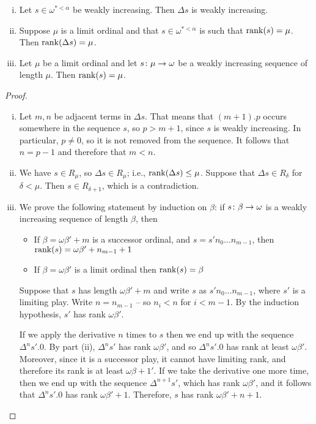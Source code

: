 \documentclass[11pt]{article} %
\begin{document}
\begin{lemma}
  \label{WeaklyIncreasingLemma}
  \begin{enumerate}[i)]
    \item Let $s\in\omega^{*<\alpha}$ be weakly increasing.  Then $\Delta s$ is weakly increasing.
    \item Suppose $\mu$ is a limit ordinal and that $s\in \omega^{*<\alpha}$ is such that $\operatorname{rank}(s)=\mu$.  Then $\operatorname{rank}(\Delta s)=\mu$.
    \item Let $\mu$ be a limit ordinal and let $s\colon\mu\to\omega$ be a weakly increasing sequence of length $\mu$.  Then $\operatorname{rank}(s)=\mu$.  
  \end{enumerate}

  \begin{proof}
    \begin{enumerate}[(i): ]
      \item Let $m,n$ be adjacent terms in $\Delta s$.  That means that $(m+1).p$ occurs somewhere in the sequence $s$, so $p>m+1$, since $s$ is weakly increasing.  In particular, $p\ne 0$, so it is not removed from the sequence.  It follows that $n=p-1$ and therefore that $m<n$.  

      \item We have $s\in R_\mu$, so $\Delta s\in R_\mu$; i.e., $\operatorname{rank}(\Delta s)\le\mu$.  Suppose that $\Delta s\in R_\delta$ for $\delta<\mu$.  Then $s\in R_{\delta+1}$, which is a contradiction.

      \item We prove the following statement by induction on $\beta$: if $s\colon\beta\to\omega$ is a weakly increasing sequence of length $\beta$, then
        \begin{itemize}
          \item If $\beta=\omega\beta'+m$ is a successor ordinal, and $s=s'n_0\dots n_{m-1}$, then $\operatorname{rank}(s) = \omega\beta'+n_{m-1}+1$
          \item If $\beta=\omega\beta'$ is a limit ordinal then $\operatorname{rank}(s)=\beta$
        \end{itemize}
        Suppose that $s$ has length $\omega\beta'+m$ and write $s$ as $s'n_0\dots n_{m-1}$, where $s'$ is a limiting play.  Write $n=n_{m-1}$ -- so $n_i<n$ for $i<m-1$.  By the induction hypothesis, $s'$ has rank $\omega\beta'$.  

        If we apply the derivative $n$ times to $s$ then we end up with the sequence $\Delta^n s'.0$.  By part (ii), $\Delta^n s'$ has rank $\omega\beta'$, and so $\Delta^n s'.0$ has rank at least $\omega\beta'$.  Moreover, since it is a successor play, it cannot have limiting rank, and therefore its rank is at least $\omega\beta+1'$.  If we take the derivative one more time, then we end up with the sequence $\Delta^{n+1}s'$, which has rank $\omega\beta'$, and it follows that $\Delta^n s'.0$ has rank $\omega\beta'+1$.  Therefore, $s$ has rank $\omega\beta'+n+1$.  


\end{enumerate}
\end{proof}
\end{lemma}
\end{document}
